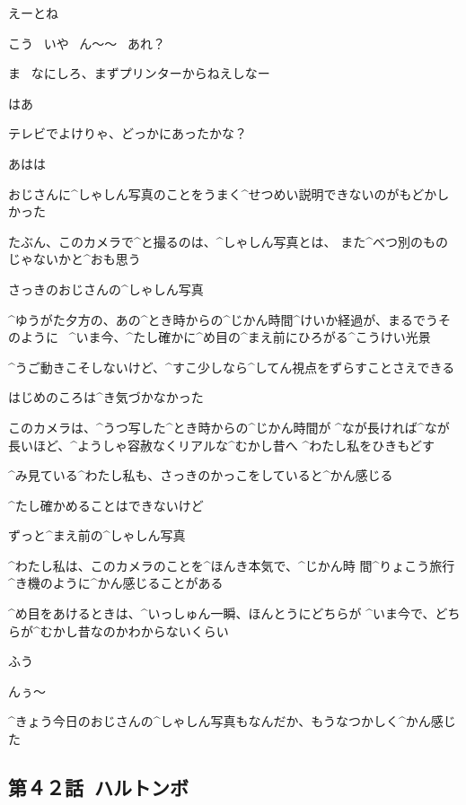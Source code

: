 \Alpha えーとね

\Alpha こう
\ いや
\ ん〜〜
\ あれ？

\Ojisan ま
\ なにしろ、まずプリンターからねえしなー

\Alpha はあ

\Ojisan テレビでよけりゃ、どっかにあったかな？

\Alpha あはは

\page[138]
\Alpha おじさんに^{しゃしん}{写真}のことをうまく^{せつめい}{説明}できないのがもどかしかった

\Alpha たぶん、このカメラで^{と}{撮}るのは、^{しゃしん}{写真}とは、
また^{べつ}{別}のものじゃないかと^{おも}{思}う

\page[139]
\Alpha さっきのおじさんの^{しゃしん}{写真}

\page[140]
\Alpha ^{ゆうがた}{夕方}の、あの^{とき}{時}からの^{じかん}{時間}^{けいか}{経過}が、まるでうそのように
\ ^{いま}{今}、^{たし}{確}かに^{め}{目}の^{まえ}{前}にひろがる^{こうけい}{光景}

\Alpha ^{うご}{動}きこそしないけど、^{すこ}{少}しなら^{してん}{視点}をずらすことさえできる

\page[141]
\Alpha はじめのころは^{き}{気}づかなかった

\Alpha このカメラは、^{うつ}{写}した^{とき}{時}からの^{じかん}{時間}が
^{なが}{長}ければ^{なが}{長}いほど、^{ようしゃ}{容赦}なくリアルな^{むかし}{昔}へ
^{わたし}{私}をひきもどす

\Alpha ^{み}{見}ている^{わたし}{私}も、さっきのかっこをしていると^{かん}{感}じる

\Alpha ^{たし}{確}かめることはできないけど

\Alpha ずっと^{まえ}{前}の^{しゃしん}{写真}

\page[143]
\Alpha ^{わたし}{私}は、このカメラのことを^{ほんき}{本気}で、^{じかん}{時
  間}^{りょこう}{旅行}^{き}{機}のように^{かん}{感}じることがある

\page[144]
\Alpha ^{め}{目}をあけるときは、^{いっしゅん}{一瞬}、ほんとうにどちらが
^{いま}{今}で、どちらが^{むかし}{昔}なのかわからないくらい

\page[145]
\Alpha ふう

\Alpha んぅ〜

\page[146]
\Alpha ^{きょう}{今日}のおじさんの^{しゃしん}{写真}もなんだか、もうなつかしく^{かん}{感}じた


\subsection{第４２話\ ハルトンボ}

